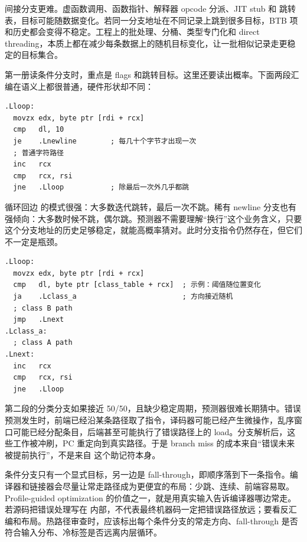 间接分支更难。虚函数调用、函数指针、解释器 opcode 分派、JIT stub 和  跳转表，目标可能随数据变化。若同一分支地址在不同记录上跳到很多目标，BTB 项和历史都会变得不稳定。工程上的批处理、分桶、类型专门化和 direct threading，本质上都在减少每条数据上的随机目标变化，让一批相似记录走更稳定的目标集合。

第一册读条件分支时，重点是 flags 和跳转目标。这里还要读出概率。下面两段汇编在语义上都很普通，硬件形状却不同：

\begin{lstlisting}[numbers=none,caption={规则输入上的循环回边和稀有分支}]
.Lloop:
  movzx edx, byte ptr [rdi + rcx]
  cmp   dl, 10
  je    .Lnewline        ; 每几十个字节才出现一次
  ; 普通字符路径
  inc   rcx
  cmp   rcx, rsi
  jne   .Lloop           ; 除最后一次外几乎都跳
\end{lstlisting}

循环回边  的模式很强：大多数迭代跳转，最后一次不跳。稀有 newline 分支也有强倾向：大多数时候不跳，偶尔跳。预测器不需要理解“换行”这个业务含义，只要这个分支地址的历史足够稳定，就能高概率猜对。此时分支指令仍然存在，但它们不一定是瓶颈。

\begin{lstlisting}[numbers=none,caption={随机分类输入上的接近均匀分支}]
.Lloop:
  movzx edx, byte ptr [rdi + rcx]
  cmp   dl, byte ptr [class_table + rcx]  ; 示例：阈值随位置变化
  ja    .Lclass_a                         ; 方向接近随机
  ; class B path
  jmp   .Lnext
.Lclass_a:
  ; class A path
.Lnext:
  inc   rcx
  cmp   rcx, rsi
  jne   .Lloop
\end{lstlisting}

第二段的分类分支如果接近 50/50，且缺少稳定周期，预测器很难长期猜中。错误预测发生时，前端已经沿某条路径取了指令，译码器可能已经产生微操作，乱序窗口可能已经分配条目，后端甚至可能执行了错误路径上的 load。分支解析后，这些工作被冲刷，PC 重定向到真实路径。于是 branch miss 的成本来自“错误未来被提前执行”，不是来自  这个助记符本身。

条件分支只有一个显式目标，另一边是 fall-through，即顺序落到下一条指令。编译器和链接器会尽量让常走路径成为更便宜的布局：少跳、连续、前端容易取。Profile-guided optimization 的价值之一，就是用真实输入告诉编译器哪边常走。若源码把错误处理写在  内部，不代表最终机器码一定把错误路径放远；要看反汇编和布局。热路径审查时，应该标出每个条件分支的常走方向、fall-through 是否符合输入分布、冷标签是否远离内层循环。

